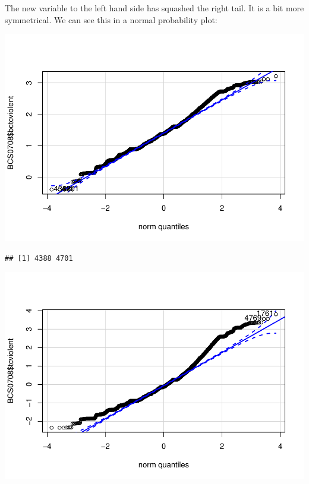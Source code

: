 \documentclass[]{book}
\newenvironment{Shaded}{\begin{snugshade}}{\end{snugshade}}
\newcommand{\KeywordTok}[1]{\textcolor[rgb]{0.13,0.29,0.53}{\textbf{#1}}}
\newcommand{\NormalTok}[1]{#1}
\newcommand{\OperatorTok}[1]{\textcolor[rgb]{0.81,0.36,0.00}{\textbf{#1}}}
\theoremstyle{definition}
\theoremstyle{definition}
\theoremstyle{definition}
\theoremstyle{remark}
\begin{document}
The new variable to the left hand side has squashed the right tail. It
is a bit more symmetrical. We can see this in a normal probability plot:

\begin{Shaded}
\end{Shaded}

\includegraphics{06-hypothesis_testing_files/figure-latex/unnamed-chunk-23-1.pdf}

\begin{verbatim}
## [1] 4388 4701
\end{verbatim}

\begin{Shaded}
\end{Shaded}

\includegraphics{06-hypothesis_testing_files/figure-latex/unnamed-chunk-23-2.pdf}
\end{document}
